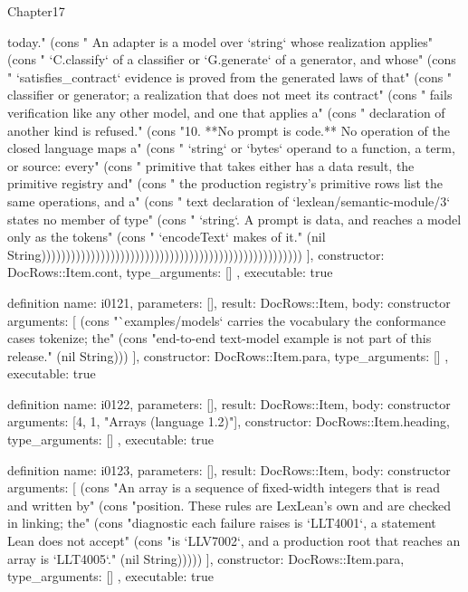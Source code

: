 \begin{lexlean}{Chapter17}
\begin{semanticmodule}
{{today." (cons "   An adapter is a model over `string` whose realization applies" (cons "   `C.classify` of a classifier or `G.generate` of a generator, and whose" (cons "   `satisfies_contract` evidence is proved from the generated laws of that" (cons "   classifier or generator; a realization that does not meet its contract" (cons "   fails verification like any other model, and one that applies a" (cons "   declaration of another kind is refused." (cons "10. **No prompt is code.** No operation of the closed language maps a" (cons "   `string` or `bytes` operand to a function, a term, or source: every" (cons "   primitive that takes either has a data result, the primitive registry and" (cons "   the production registry's primitive rows list the same operations, and a" (cons "   text declaration of `lexlean/semantic-module/3` states no member of type" (cons "   `string`. A prompt is data, and reaches a model only as the tokens" (cons "   `encodeText` makes of it." (nil String)))))))))))))))))))))))))))))))))))))))))))))))))))))
    ],
    constructor: DocRows::Item.cont,
    type_arguments: []
  },
  executable: true
}

definition{
  name: i0121,
  parameters: [],
  result: DocRows::Item,
  body: constructor{
    arguments: [
      (cons "`examples/models` carries the vocabulary the conformance cases tokenize; the" (cons "end-to-end text-model example is not part of this release." (nil String)))
    ],
    constructor: DocRows::Item.para,
    type_arguments: []
  },
  executable: true
}

definition{
  name: i0122,
  parameters: [],
  result: DocRows::Item,
  body: constructor{
    arguments: [4, 1, "Arrays (language 1.2)"],
    constructor: DocRows::Item.heading,
    type_arguments: []
  },
  executable: true
}

definition{
  name: i0123,
  parameters: [],
  result: DocRows::Item,
  body: constructor{
    arguments: [
      (cons "An array is a sequence of fixed-width integers that is read and written by" (cons "position. These rules are LexLean's own and are checked in linking; the" (cons "diagnostic each failure raises is `LLT4001`, a statement Lean does not accept" (cons "is `LLV7002`, and a production root that reaches an array is `LLT4005`." (nil String)))))
    ],
    constructor: DocRows::Item.para,
    type_arguments: []
  },
  executable: true
}


\end{semanticmodule}
\end{lexlean}
